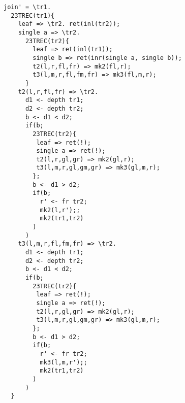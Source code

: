 \begin{itemize}
\begin{verbatim}
join' = \tr1.
  23TREC(tr1){
    leaf => \tr2. ret(inl(tr2));
    single a => \tr2.
      23TREC(tr2){
        leaf => ret(inl(tr1));
        single b => ret(inr(single a, single b));
        t2(l,r,fl,fr) => mk2(fl,r);
        t3(l,m,r,fl,fm,fr) => mk3(fl,m,r);
      }
    t2(l,r,fl,fr) => \tr2.
      d1 <- depth tr1;
      d2 <- depth tr2;
      b <- d1 < d2;
      if(b;
        23TREC(tr2){
         leaf => ret(!);
         single a => ret(!);
         t2(l,r,gl,gr) => mk2(gl,r);
         t3(l,m,r,gl,gm,gr) => mk3(gl,m,r);
        };
        b <- d1 > d2;
        if(b;
          r' <- fr tr2;
          mk2(l,r');;
          mk2(tr1,tr2)
        )
      )
    t3(l,m,r,fl,fm,fr) => \tr2.
      d1 <- depth tr1;
      d2 <- depth tr2;
      b <- d1 < d2;
      if(b;
        23TREC(tr2){
         leaf => ret(!);
         single a => ret(!);
         t2(l,r,gl,gr) => mk2(gl,r);
         t3(l,m,r,gl,gm,gr) => mk3(gl,m,r);
        };
        b <- d1 > d2;
        if(b;
          r' <- fr tr2;
          mk3(l,m,r');;
          mk2(tr1,tr2)
        )
      )
  }
  
\end{verbatim}

\iffalse
  \left
  \mathsf{full\_left} \triangleq 
    \lam{t}{\_}{
      \lam{n}{\_}{
      \ttrec{t}{\const{\zero}}{\_}{\const{\zero}}
        {\_,\_,s_l,d_l,\_,\_,f_l,\_}\\{
          \bind{d_l+1}{d}{\bind{\eq\;n\;d}{b}{\ifnat{b}{\ret{b}}{\ret{f_l}}}}}\\
        {\_,\_,\_,s_l,d_l,\_,\_,\_,\_,f_l,\_,\_}{
          \bind{d_l+1}{d}{\bind{\eq\;n\;d}{b}{\ifnat{b}{\ret{\zero}}{\ret{f_l}}}}}
        }
        }\\
  \mathsf{full\_right} \triangleq 
    \lam{t}{}{
      \ttrec{t}{\const{\zero}}{\_}{\const{\zero}}
        {\_}{\lam{n}{\_}{\eq\;n\;d}}
          {\_,\_,f_l,f_r}{\bind{n-1}{n'}{f_r\; n'}}
        }\\
\join \triangleq 
  \lam{t_1}{\tttree{A}{s_1}{d_1}}{
    \lam{t_2}{\tttree{A}{s_2}{d_2}}{
    }}
\fi
\end{itemize}
